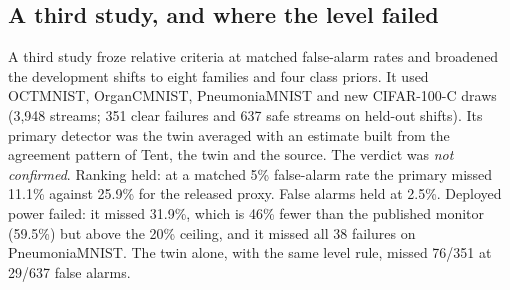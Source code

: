 \documentclass[runningheads]{llncs}
\begin{document}
\begin{table}[t]
\caption{Held-out results with alarm levels set on shifted development streams. First study: BloodMNIST and DermaMNIST, Tent $10^{-3}$ and $5\times10^{-3}$. Second study: PathMNIST, OrganAMNIST and CIFAR-100-C (six checkpoints), Tent $10^{-3}$. Matched: missed share at about 6\% false alarms with per-group thresholds set with hindsight, and within-group AUROC (second study).}
\label{tab:shifted}
\centering\footnotesize\setlength{\tabcolsep}{4pt}
\end{table}

\subsection{A third study, and where the level failed}
A third study froze relative criteria at matched false-alarm rates and broadened the development shifts to eight families and four class priors. It used OCTMNIST, OrganCMNIST, PneumoniaMNIST and new CIFAR-100-C draws (3,948 streams; 351 clear failures and 637 safe streams on held-out shifts). Its primary detector was the twin averaged with an estimate built from the agreement pattern of Tent, the twin and the source. The verdict was \emph{not confirmed}. Ranking held: at a matched 5\% false-alarm rate the primary missed 11.1\% against 25.9\% for the released proxy. False alarms held at 2.5\%. Deployed power failed: it missed 31.9\%, which is 46\% fewer than the published monitor (59.5\%) but above the 20\% ceiling, and it missed all 38 failures on PneumoniaMNIST. The twin alone, with the same level rule, missed 76/351 at 29/637 false alarms.
\end{document}
